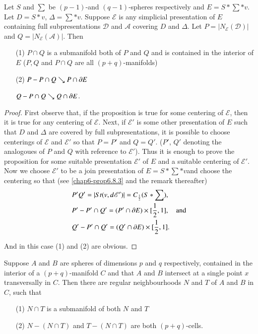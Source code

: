 \begin{proposition}\label{chap8-prop8.5.5}
Let $S$ and $\sum$ be $(p-1)$-and $(q-1)$-spheres respectively and $E=S\ast \sum \ast v$. Let $D=S\ast v$, $\Delta=\sum \ast v$. Suppose $\mathscr{E}$ is any simplicial presentation of $E$ containing full subpresentations $\mathscr{D}$ and $\mathscr{A}$ covering $D$ and $\Delta$. Let $P=|N_{\mathscr{E}}(\mathscr{D})|$ and $Q=|N_{\mathscr{E}}(\mathscr{A})|$. Then 
\begin{itemize}
\item[(1)] $P\cap Q$ is a submanifold both of $P$ and $Q$ and is contained in the interior of $E$ ($P,Q$ and $P\cap Q$ are all $(p+q)$-manifolds)

\item[(2)] $P-P\cap Q\searrow P\cap \partial E$

$Q-P\cap Q\searrow Q\cap \partial E$.
\end{itemize}
\end{proposition}

\begin{proof}
First observe that, if the proposition is true for some centering of $\mathscr{E}$, then it is true for any centering of $\mathscr{E}$. Next, if $\mathscr{E}'$ is some other presentation of $E$ such that $D$ and $\Delta$ are covered by full subpresentations, it is possible to choose centerings of $\mathscr{E}$ and $\mathscr{E}'$ so that $P=P'$ and $Q=Q'$. ($P'$, $Q'$ denoting the analogoues of $P$ and $Q$ with reference to $\mathscr{E}'$). Thus it is enough to prove the proposition for some suitable presentation $\mathscr{E}'$ of $E$ and a suitable centering of $\mathscr{E}'$. Now we choose $\mathscr{E}'$ to be a join presentation of $E=S\ast \sum \ast v$\pageoriginale and choose the centering so that (see \ref{chap6-prop6.8.3} and the remark thereafter)
\begin{align*}
& P'Q'=|St(v,d\mathscr{E}')|=C_{\frac{1}{2}}(S\ast \sum),\\
& P'-P'\cap Q'=(P'\cap \partial E)\times [\frac{1}{2},1],\quad\text{and}\\
& Q'-P'\cap Q'=(Q'\cap \partial E)\times [\frac{1}{2},1].
\end{align*}

And in this case (1) and (2) are obvious.
\end{proof}

\begin{proposition}\label{chap8-prop8.5.6}
Suppose $A$ and $B$ are spheres of dimensions $p$ and $q$ respectively, contained in the interior of a $(p+q)$-manifold $C$ and that $A$ and $B$ intersect at a single point $x$ transversally in $C$. Then there are regular neighbourhoods $N$ and $T$ of $A$ and $B$ in $C$, such that
\begin{itemize}
\item[(1)] $N\cap T$ is a submanifold of both $N$ and $T$

\item[(2)] $N-(N\cap T)$ and $T-(N\cap T)$ are both $(p+q)$-cells.
\end{itemize}
\end{proposition}

